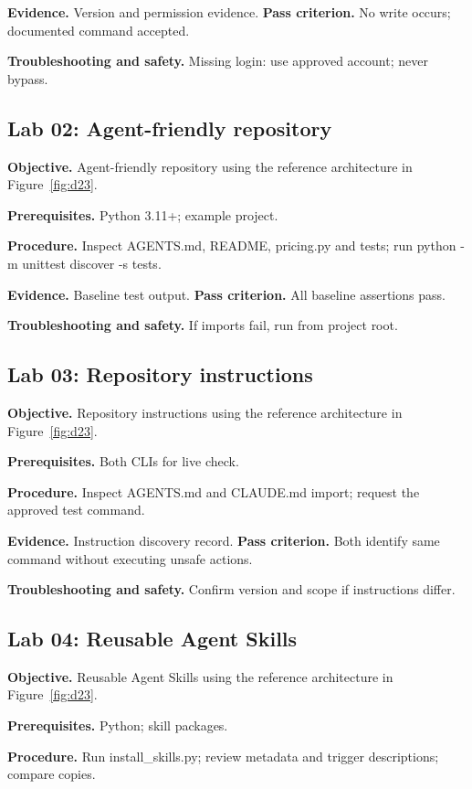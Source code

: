 \textbf{Evidence.} Version and permission evidence. \textbf{Pass criterion.} No write occurs; documented command accepted.

\textbf{Troubleshooting and safety.} Missing login: use approved account; never bypass.

\subsection{Lab 02: Agent-friendly repository}

\textbf{Objective.} Agent-friendly repository using the reference architecture in Figure~\ref{fig:d23}.

\textbf{Prerequisites.} Python 3.11+; example project.

\textbf{Procedure.} Inspect AGENTS.md, README, pricing.py and tests; run python -m unittest discover -s tests.

\textbf{Evidence.} Baseline test output. \textbf{Pass criterion.} All baseline assertions pass.

\textbf{Troubleshooting and safety.} If imports fail, run from project root.

\subsection{Lab 03: Repository instructions}

\textbf{Objective.} Repository instructions using the reference architecture in Figure~\ref{fig:d23}.

\textbf{Prerequisites.} Both CLIs for live check.

\textbf{Procedure.} Inspect AGENTS.md and CLAUDE.md import; request the approved test command.

\textbf{Evidence.} Instruction discovery record. \textbf{Pass criterion.} Both identify same command without executing unsafe actions.

\textbf{Troubleshooting and safety.} Confirm version and scope if instructions differ.

\subsection{Lab 04: Reusable Agent Skills}

\textbf{Objective.} Reusable Agent Skills using the reference architecture in Figure~\ref{fig:d23}.

\textbf{Prerequisites.} Python; skill packages.

\textbf{Procedure.} Run install\_skills.py; review metadata and trigger descriptions; compare copies.

